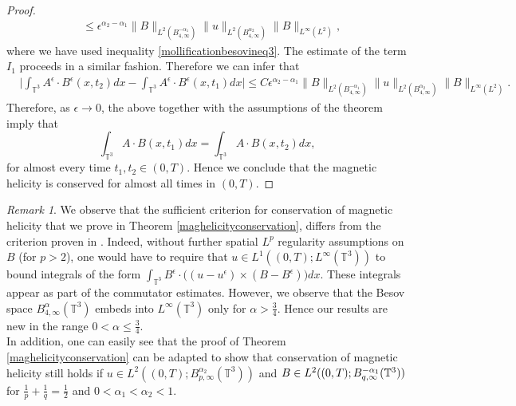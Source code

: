 \documentclass[12pt,a4paper]{article}
\theoremstyle{definition}
\theoremstyle{remark}
\newtheorem{remark}[theorem]{Remark}
\numberwithin{equation}{section}
\begin{document}
\begin{proof}
\begin{align*}
&\leq \epsilon^{\alpha_2 - \alpha_1} \lVert B \rVert_{L^2 (B^{-\alpha_1}_{4,\infty})} \lVert u \rVert_{L^2 (B^{\alpha_2}_{4,\infty})} \lVert B \rVert_{L^\infty (L^2)}, 
\end{align*}
where we have used inequality \eqref{mollificationbesovineq3}. The estimate of the term $I_1$ proceeds in a similar fashion. Therefore we can infer that
\begin{align*}
&\bigg\lvert \int_{\mathbb{T}^3} A^\epsilon \cdot B^\epsilon (x,t_2) dx - \int_{\mathbb{T}^3} A^\epsilon \cdot B^\epsilon (x,t_1) dx \bigg\rvert \leq C \epsilon^{\alpha_2 - \alpha_1} \lVert B \rVert_{L^2 (B^{-\alpha_1}_{4,\infty})} \lVert u \rVert_{L^2 (B^{\alpha_2}_{4,\infty})} \lVert B \rVert_{L^\infty (L^2)}.
\end{align*}
Therefore, as $\epsilon \rightarrow 0$, the above together with the assumptions of the theorem imply that
\begin{equation}
\int_{\mathbb{T}^3} A \cdot B (x,t_1) dx = \int_{\mathbb{T}^3} A \cdot B (x,t_2) dx,
\end{equation}
for almost every time $t_1, t_2 \in (0,T)$.
Hence we conclude that the magnetic helicity is conserved for almost all times in $(0,T)$. 

\end{proof}

\begin{remark}
We observe that the sufficient criterion for conservation of magnetic helicity that we prove in Theorem \ref{maghelicityconservation}, differs from the criterion proven in \cite{kang}. Indeed, without further spatial $L^p$ regularity assumptions on $B$ (for $p > 2$), one would have to require that $u \in L^1 ((0,T); L^\infty (\mathbb{T}^3))$ to bound integrals of the form $\int_{\mathbb{T}^3} B^\epsilon \cdot \big( (u - u^\epsilon) \times (B - B^\epsilon) \big) dx$. These integrals appear as part of the commutator estimates. However, we observe that the Besov space $B^{\alpha}_{4,\infty} (\mathbb{T}^3)$ embeds into $L^\infty (\mathbb{T}^3)$ only for $\alpha > \frac{3}{4}$. Hence our results are new in the range $0 < \alpha \leq \frac{3}{4}$.  \\
In addition, one can easily see that the proof of Theorem \ref{maghelicityconservation} can be adapted to show that conservation of magnetic helicity still holds if $u \in L^2 ((0,T); B^{\alpha_2}_{p,\infty} (\mathbb{T}^3))$ and $B \in L^2 ((0,T); \linebreak B^{-\alpha_1}_{q,\infty} (\mathbb{T}^3))$ for $\frac{1}{p} + \frac{1}{q} = \frac{1}{2}$ and $0 < \alpha_1 < \alpha_2 < 1$. 
\end{remark}
\end{document}

